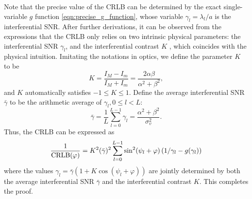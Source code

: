 \documentclass[journal,twocolumn]{IEEEtran}
\theoremstyle{nonumberplain}
\begin{document}
    Note that the precise value of the CRLB can be determined by the exact  single-variable $g$ function \eqref{eqn:precise_g_function}, whose variable $\gamma_l = \lambda_l / a$ is the interferential SNR. After further derivations, it can be observed from the expressions that the CRLB only relies on two intrinsic physical parameters: the interferential SNR $\gamma_l$, and the interferential contrast $K$ \cite{louradour1993interference}, which coincides with the physical intuition. Imitating the notations in optics, we define the parameter $K$ to be  
    \begin{equation}
        K = \frac{I_M - I_m}{I_M + I_m} = \frac{2\alpha\beta}{\alpha^2+\beta^2},
    \end{equation}
    and $K$ automatically satisfies $-1\leq K\leq 1$. Define the average interferential SNR $\bar{\gamma}$ to be the arithmetic average of $\gamma_l, 0\leq l < L$:
    \begin{equation}
        \bar{\gamma} = \frac{1}{L}\sum_{l=0}^{L-1}{\gamma_l} = \frac{\alpha^2+\beta^2}{\sigma_v^2}.
    \end{equation}
    Thus, the CRLB can be expressed as 
    \begin{equation}
        \frac{1}{{\rm CRLB}(\varphi)} = K^2(\bar{\gamma})^2 \sum_{l=0}^{L-1}{ \sin^2(\psi_l+\varphi) \left(1/\gamma_l-g(\gamma_l)\right) }
    \end{equation}
    where the values $\gamma_l=\bar{\gamma}\left(1+K\cos(\psi_l+\varphi)\right)$ are jointly determined by both the average interferential SNR $\bar{\gamma}$ and the interferential contrast $K$. This completes the proof.
\end{document}
